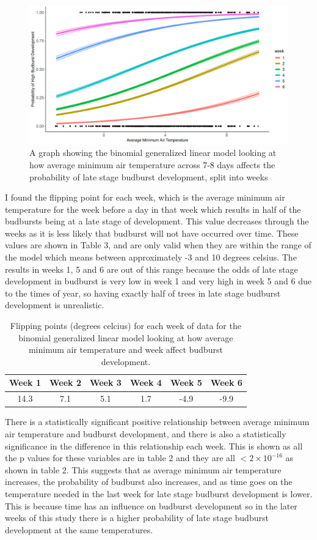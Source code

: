 \documentclass{article}
\begin{document}
\begin{figure}[H]
        \centering
        \includegraphics[width=1\linewidth]{../data/Rplot.png}
        \caption{A graph showing the binomial generalized linear model looking at how average minimum air temperature across 7-8 days affects the probability of late stage budburst development, split into weeks}
        \label{fig:enter-label}
    \end{figure}
I found the flipping point for each week, which is the average minimum air temperature for the week before a day in that week which results in half of the budbursts being at a late stage of development. This value decreases through the weeks as it is less likely that budburst will not have occurred over time. These values are shown in Table 3, and are only valid when they are within the range of the model which means between approximately -3 and 10 degrees celsius. The results in weeks 1, 5 and 6 are out of this range because the odds of late stage development in budburst is very low in week 1 and very high in week 5 and 6 due to the times of year, so having exactly half of trees in late stage budburst development is unrealistic. 

\begin{table}[h!]
    \caption{Flipping points (degrees celcius) for each week of data for the binomial generalized linear model looking at how average minimum air temperature and week affect budburst development.}
    \centering
    \begin{tabular}{|c|c|c|c|c|c|}
    \hline
        Week 1  &  Week 2  &  Week 3 &  Week 4 &  Week 5 &  Week 6\\
        \hline
        14.3 & 7.1 & 5.1 & 1.7 & -4.9 & -9.9 \\
         \hline
    \end{tabular}
\end{table}

There is a statistically significant positive relationship between average minimum air temperature and budburst development, and there is also a statistically significance in the difference in this relationship each week. This is shown as all the p values for these variables are in table 2 and they are all $<2 \times 10^{-16}$ as shown in table 2. This suggests that as average minimum air temperature increases, the probability of budburst also increases, and as time goes on the temperature needed in the last week for late stage budburst development is lower. This is because time has an influence on budburst development so in the later weeks of this study there is a higher probability of late stage budburst development at the same temperatures.
\end{document}
